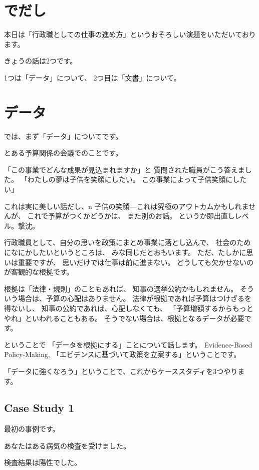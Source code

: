 \documentclass[uplatex,jis2004,dvipdfmx,12pt]{jsarticle}
\begin{document}
\section{でだし}
本日は「行政職としての仕事の進め方」というおそろしい演題をいただいております。

きょうの話は2つです。

1つは「データ」について、
2つ目は「文書」について。


\section{データ}
では、まず「データ」についてです。

とある予算関係の会議でのことです。

「この事業でどんな成果が見込まれますか」と
質問された職員がこう答えました。
「わたしの夢は子供を笑顔にしたい。
この事業によって子供笑顔にしたい」

これは実に美しい話だし、n
子供の笑顔---これは究極のアウトカムかもしれませんが、
これで予算がつくかどうかは、
また別のお話。
というか即出直しレベル。撃沈。

行政職員として、自分の思いを政策にまとめ事業に落とし込んで、
社会のためになにかしたいというところは、
みな同じだとおもいます。
ただ、たしかに思いは重要ですが、
思いだけでは仕事は前に進まない。
どうしても欠かせないのが客観的な根拠です。

根拠は「法律・規則」のこともあれば、
知事の選挙公約かもしれません。
そういう場合は、予算の心配はありません。
法律が根拠であれば予算はつけざるを得ないし、
知事の公約であれば、心配しなくても、
「予算増額するからもっとやれ」といわれることもある。
そうでない場合は、根拠となるデータが必要です。

ということで
「データを根拠にする」ことについて話します。
Evidence-Based Policy-Making,
「エビデンスに基づいて政策を立案する」ということです。

「データに強くなろう」ということで、これからケーススタディを3つやります。

\subsection{Case Study 1}
最初の事例です。

あなたはある病気の検査を受けました。

検査結果は陽性でした。
\end{document}
